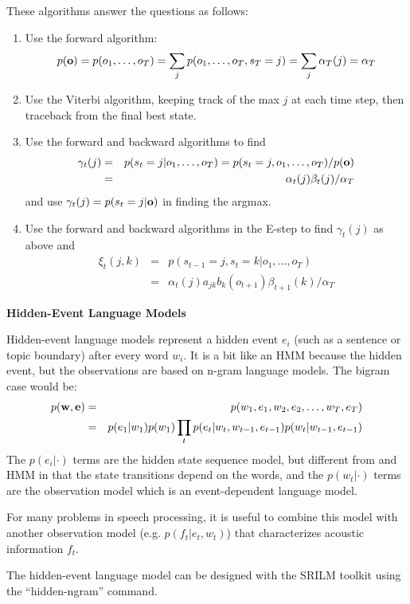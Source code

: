 \documentclass[11pt,titlepage]{article}
\begin{document}
These algorithms answer the questions as follows:
\begin{enumerate}
\item Use the forward algorithm: 
$$p({\bf o})=p(o_1,\ldots ,o_T)=\sum_j p(o_1,\ldots ,o_T,s_T=j)=\sum_j \alpha_T(j)=\alpha_T$$
\item Use the Viterbi algorithm, keeping track of the max $j$ at each time step, then traceback from the final best state.
\item Use the forward and backward algorithms to find
\begin{eqnarray*}
\gamma_t(j) & = & p(s_t = j|o_1,\ldots ,o_T) = p(s_t = j,o_1,\ldots ,o_T)/p({\bf o})\\
  & = & \alpha_t(j)\beta_t(j)/\alpha_T
\end{eqnarray*}
and use $\gamma_t(j)=p(s_t=j|{\bf o})$ in finding the argmax.
\item Use the forward and backward algorithms in the E-step to find $\gamma_t(j)$ as above and
\begin{eqnarray*}
\xi_t(j,k) & = &  p(s_{t-1} = j, s_t=k|o_1,\ldots ,o_T)  \\
  & = & \alpha_t(j)a_{jk}b_k(o_{t+1})\beta_{t+1}(k)/\alpha_T
\end{eqnarray*}
\end{enumerate}

\clearpage

\centerline{{\huge \bf Hidden-Event Language Models}}
\vskip 0.2in

Hidden-event language models represent a hidden event $e_i$ (such as a
sentence or topic boundary) after every word $w_i$. It is a bit like
an HMM because the hidden event, but the observations are based on n-gram
language models. The bigram case would be:
\begin{eqnarray*}
p({\bf w},{\bf e}) & = & p(w_1,e_1, w_2,e_2, \ldots , w_T,e_T)\\
 & = & p(e_1|w_1)p(w_1)\prod_t p(e_t|w_t,w_{t-1},e_{t-1})p(w_t|w_{t-1},e_{t-1})
\end{eqnarray*}
The $p(e_i|\cdot)$ terms are the hidden state sequence model, but different from and HMM in that the state transitions depend on the words, and the $p(w_t|\cdot)$ terms are the observation model which is an event-dependent language model.

\vskip 0.1in

For many problems in speech processing, it is useful to combine this model with another observation model (e.g. $p(f_t|e_t,w_t)$) that characterizes acoustic information $f_t$.

\vskip 0.1in

The hidden-event language model can be designed with the SRILM toolkit using
the ``hidden-ngram'' command. 
\end{document}
